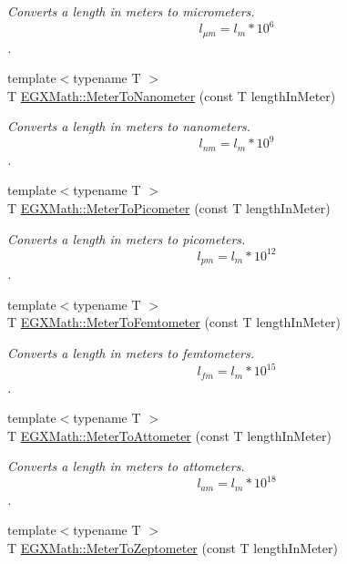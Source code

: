 \begin{DoxyCompactItemize}
\begin{DoxyCompactList}\small\item\em Converts a length in meters to micrometers. \[ l_{\mu m}=l_{m} * 10^{6} \]. \end{DoxyCompactList}\item 
{\footnotesize template$<$typename T $>$ }\\T \mbox{\hyperlink{group___e_g_x_math-_conversions-_length_conversions-_meter-_s_i_gad3532cd9d0a9b97ae34aadc0eea27c57}{E\+G\+X\+Math\+::\+Meter\+To\+Nanometer}} (const T length\+In\+Meter)
\begin{DoxyCompactList}\small\item\em Converts a length in meters to nanometers. \[ l_{nm}=l_{m} * 10^{9} \]. \end{DoxyCompactList}\item 
{\footnotesize template$<$typename T $>$ }\\T \mbox{\hyperlink{group___e_g_x_math-_conversions-_length_conversions-_meter-_s_i_ga5e136454c20254062d6e8637cfbfb8ee}{E\+G\+X\+Math\+::\+Meter\+To\+Picometer}} (const T length\+In\+Meter)
\begin{DoxyCompactList}\small\item\em Converts a length in meters to picometers. \[ l_{pm}=l_{m} * 10^{12} \]. \end{DoxyCompactList}\item 
{\footnotesize template$<$typename T $>$ }\\T \mbox{\hyperlink{group___e_g_x_math-_conversions-_length_conversions-_meter-_s_i_ga9fbb9437aa02f79a445e8c6177d0153e}{E\+G\+X\+Math\+::\+Meter\+To\+Femtometer}} (const T length\+In\+Meter)
\begin{DoxyCompactList}\small\item\em Converts a length in meters to femtometers. \[ l_{fm}=l_{m} * 10^{15} \]. \end{DoxyCompactList}\item 
{\footnotesize template$<$typename T $>$ }\\T \mbox{\hyperlink{group___e_g_x_math-_conversions-_length_conversions-_meter-_s_i_ga7c27a5231b96b904786f519e8bad257c}{E\+G\+X\+Math\+::\+Meter\+To\+Attometer}} (const T length\+In\+Meter)
\begin{DoxyCompactList}\small\item\em Converts a length in meters to attometers. \[ l_{am}=l_{m} * 10^{18} \]. \end{DoxyCompactList}\item 
{\footnotesize template$<$typename T $>$ }\\T \mbox{\hyperlink{group___e_g_x_math-_conversions-_length_conversions-_meter-_s_i_ga865c00bc3abce82de30d18022f460a5c}{E\+G\+X\+Math\+::\+Meter\+To\+Zeptometer}} (const T length\+In\+Meter)

\end{DoxyCompactItemize}
